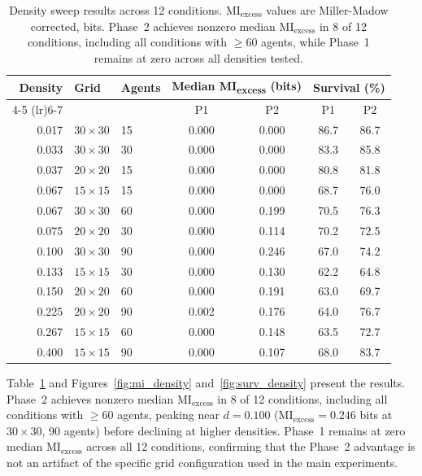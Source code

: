 \documentclass[letterpaper]{article}
\begin{document}
\begin{table}[htbp]
\centering
\caption{Density sweep results across 12 conditions.
$\mathrm{MI}_{\mathrm{excess}}$ values are
Miller-Madow corrected, bits.  Phase~2 achieves nonzero median
$\mathrm{MI}_{\mathrm{excess}}$ in 8 of 12 conditions, including all
conditions with $\geq 60$ agents, while Phase~1 remains at zero across
all densities tested.}
\label{tab:density_sweep}
\begin{tabular}{rllcccc}
\toprule
Density & Grid & Agents & \multicolumn{2}{c}{Median MI\textsubscript{excess} (bits)} & \multicolumn{2}{c}{Survival (\%)} \\
\cmidrule(lr){4-5} \cmidrule(lr){6-7}
 & & & P1 & P2 & P1 & P2 \\
\midrule
0.017 & $30 \times 30$ & 15 & 0.000 & 0.000 & 86.7 & 86.7 \\
0.033 & $30 \times 30$ & 30 & 0.000 & 0.000 & 83.3 & 85.8 \\
0.037 & $20 \times 20$ & 15 & 0.000 & 0.000 & 80.8 & 81.8 \\
0.067 & $15 \times 15$ & 15 & 0.000 & 0.000 & 68.7 & 76.0 \\
0.067 & $30 \times 30$ & 60 & 0.000 & 0.199 & 70.5 & 76.3 \\
0.075 & $20 \times 20$ & 30 & 0.000 & 0.114 & 70.2 & 72.5 \\
0.100 & $30 \times 30$ & 90 & 0.000 & 0.246 & 67.0 & 74.2 \\
0.133 & $15 \times 15$ & 30 & 0.000 & 0.130 & 62.2 & 64.8 \\
0.150 & $20 \times 20$ & 60 & 0.000 & 0.191 & 63.0 & 69.7 \\
0.225 & $20 \times 20$ & 90 & 0.002 & 0.176 & 64.0 & 76.7 \\
0.267 & $15 \times 15$ & 60 & 0.000 & 0.148 & 63.5 & 72.7 \\
0.400 & $15 \times 15$ & 90 & 0.000 & 0.107 & 68.0 & 83.7 \\
\bottomrule
\end{tabular}
\end{table}

Table~\ref{tab:density_sweep} and Figures~\ref{fig:mi_density}
and~\ref{fig:surv_density} present the results. Phase~2 achieves nonzero
median $\mathrm{MI}_{\mathrm{excess}}$ in 8 of 12 conditions, including all
conditions with $\geq 60$ agents, peaking near $d = 0.100$
($\mathrm{MI}_{\mathrm{excess}} = 0.246$ bits at $30 \times 30$, 90 agents)
before declining at higher densities. Phase~1 remains at zero median
$\mathrm{MI}_{\mathrm{excess}}$ across all 12 conditions, confirming that the
Phase~2 advantage is not an artifact of the specific grid configuration used
in the main experiments.
\end{document}
